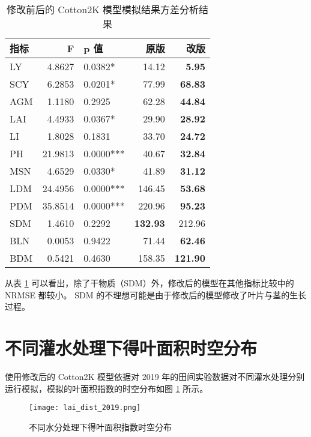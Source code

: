 \begin{table}
    \label{tab:stats}
    \caption{修改前后的 Cotton2K 模型模拟结果方差分析结果}
    \centering
    \begin{tabular}{lrlrr}
        \toprule
        指标 & F       & p 值      & 原版            & 改版            \\
        \midrule
        LY   & 4.8627  & 0.0382*   & 14.12           & \textbf{5.95}   \\
        SCY  & 6.2853  & 0.0201*   & 77.99           & \textbf{68.83}  \\
        AGM  & 1.1180  & 0.2925    & 62.28           & \textbf{44.84}  \\
        LAI  & 4.4933  & 0.0367*   & 29.90           & \textbf{28.92}  \\
        LI   & 1.8028  & 0.1831    & 33.70           & \textbf{24.72}  \\
        PH   & 21.9813 & 0.0000*** & 40.67           & \textbf{32.84}  \\
        MSN  & 4.6529  & 0.0330*   & 41.89           & \textbf{31.12}  \\
        LDM  & 24.4956 & 0.0000*** & 146.45          & \textbf{53.68}  \\
        PDM  & 35.8514 & 0.0000*** & 220.96          & \textbf{95.23}  \\
        SDM  & 1.4610  & 0.2292    & \textbf{132.93} & 212.96          \\
        BLN  & 0.0053  & 0.9422    & 71.44           & \textbf{62.46}  \\
        BDM  & 0.5421  & 0.4630    & 158.35          & \textbf{121.90} \\
        \bottomrule
    \end{tabular}
\end{table}

从表 \ref{tab:stats} 可以看出，除了干物质（SDM）外，修改后的模型在其他指标比较中的 NRMSE 都较小。%
SDM 的不理想可能是由于修改后的模型修改了叶片与茎的生长过程。%

\section{不同灌水处理下得叶面积时空分布}

使用修改后的 Cotton2K 模型依据对 2019 年的田间实验数据对不同灌水处理分别运行模拟，模拟的叶面积指数的时空分布如图 \ref{fig:laiDist} 所示。

\begin{figure}\label{fig:laiDist}
    \centering
    \texttt{[image: lai\_dist\_2019.png]}
    \caption{不同水分处理下得叶面积指数时空分布}
\end{figure}

